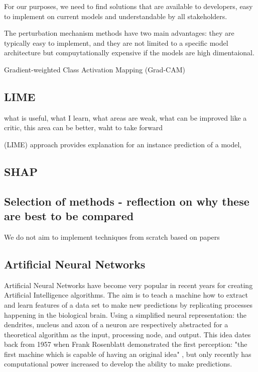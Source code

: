 \documentclass[proposal]{softeng}
\begin{document}



For our purposes, we need to find solutions that are available to developers, easy to implement on current models and understandable by all stakeholders.

The perturbation mechanism methods have two main advantages: they are typically easy to implement, and they are not limited to a specific model architecture but compuytationally expensive if the models are high dimentaional.

Gradient-weighted Class Activation Mapping (Grad-CAM)
\subsection{LIME}
what is useful, what I learn, what areas are weak, what can be improved 
like a critic, this area can be better, waht to take forward

(LIME) approach provides explanation for an instance prediction of a model,
\subsection{SHAP}
\subsection{Selection of methods - reflection on why these are best to be compared}
 We do not aim to implement techniques from scratch based on papers

\subsection{Artificial Neural Networks}

Artificial Neural Networks have become very popular in recent years for creating Artificial Intelligence algorithms. The aim is to teach a machine how to extract and learn features of a data set to make new predictions by replicating processes happening in the biological brain. Using a simplified neural representation: the dendrites, nucleus and axon of a neuron are respectively abstracted for a theoretical algorithm as the input, processing node, and output. This idea dates back from 1957 when Frank Rosenblatt demonstrated the first perception: "the first machine which is capable of having an original idea" \cite{rosenblatt}, but only recently has computational  power increased to develop the ability to make predictions.
\end{document}
